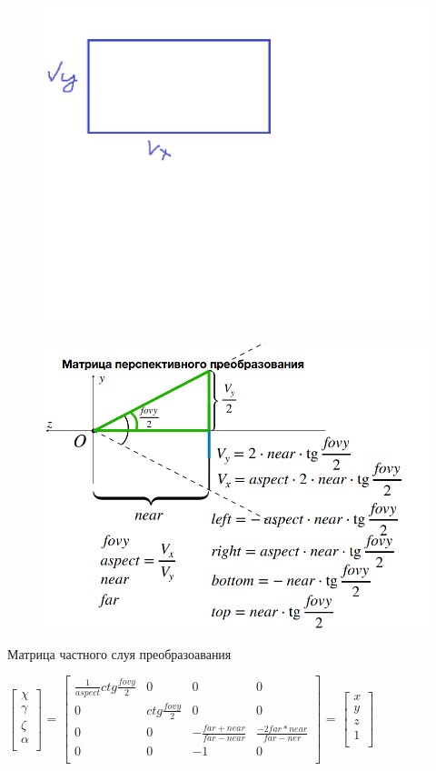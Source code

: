 \documentclass{article}
\begin{document}
\begin{figure} [H]
    \includegraphics[width=0.70\linewidth]{прям.png}
\end{figure}

\begin{figure} [H]
    \includegraphics[width=0.70\linewidth]{Снимок экрана 2025-04-14 125319.png}
\end{figure}

Матрица частного слуя преобразоавания



$\begin{bmatrix}
    \chi \\ 
    \gamma \\
    \zeta \\
    \alpha \\
\end{bmatrix}$
=
$\begin{bmatrix}
    \frac{1}{aspect}ctg\frac{fovy}{2} & 0 & 0 & 0 \\
    0 & ctg\frac{fovy}{2} & 0 & 0 \\
    0 & 0 & -\frac{far+near}{far-near} & \frac{-2far*near}{far-ner} \\
    0 & 0 & -1 & 0 \\
\end{bmatrix}$
=
$\begin{bmatrix}
    x\\
    y\\
    z\\
    1\\
\end{bmatrix}$
\end{document}
